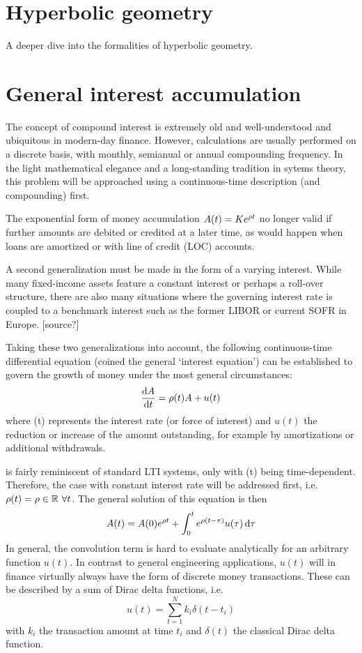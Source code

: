\section{Hyperbolic geometry}
A deeper dive into the formalities of hyperbolic geometry.

\section{General interest accumulation}
The concept of compound interest is extremely old and well-understood and ubiquitous in modern-day finance. However, calculations are usually performed on a discrete basis, with monthly, semianual or annual compounding frequency. In the light mathematical elegance and a long-standing tradition in sytems theory, this problem will be approached using a continuous-time description (and compounding) first.

The exponential form of money accumulation $A(t) = K e^{\rho t}$ no longer valid if further amounts are debited or credited at a later time, as would happen when loans are amortized or with line of credit (LOC) accounts. 

A second generalization must be made in the form of a varying interest. While many fixed-income assets feature a constant interest or perhaps a roll-over structure, there are also many situations where the governing interest rate is coupled to a benchmark interest such as the former LIBOR or current SOFR in Europe. [source?]

Taking these two generalizations into account, the following continuous-time differential equation (coined the general `interest equation') can be established to govern the growth of money under the most general circumstances:
\begin{equation}
    \dv{\ensuremath{A}}{t} = \rho(t) A + u(t)
    \label{eq:interest_equation}
\end{equation}
where \hanv(t) represents the interest rate (or force of interest) and $u(t)$ the reduction or increase of the amount outstanding, for example by amortizations or additional withdrawals. 

 is fairly reminiscent of standard LTI systems, only with \hanv(t) being time-dependent. Therefore, the case with constant interest rate will be addressed first, i.e. $\rho(t) = \rho \in \mathbb{R} \ \forall t$. The general solution of this equation is then
\begin{equation}
    A(t) = A(0)e^{\rho t} + \int_0^t e^{\rho (t - \tau)} u(\tau )\dd{\tau}
\end{equation}
In general, the convolution term is hard to evaluate analytically for an arbitrary function $u(t)$. In contrast to general engineering applications, $u(t)$ will in finance virtually always have the form of discrete money transactions. These can be described by a sum of Dirac delta functions, i.e. 
\begin{equation}
    u(t) = \sum^N_{t=1} k_i \delta(t - t_i)
\end{equation}
with $k_i$ the transaction amount at time $t_i$ and $\delta(t)$ the classical Dirac delta function.

